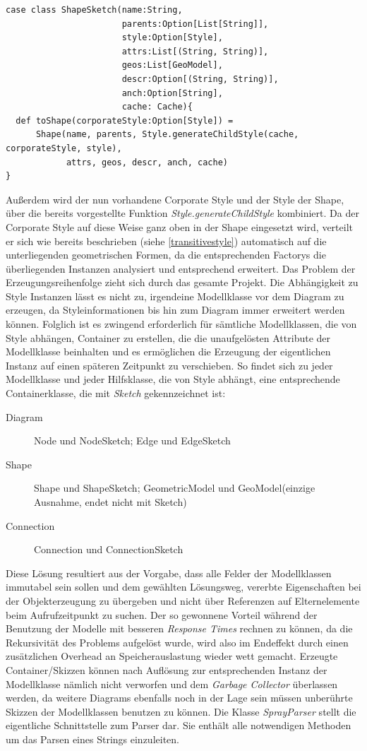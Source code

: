 \begin{lstlisting}[style=scala, caption = {Auszug aus Code Definition der ShapeSketch container Klasse}, label = {lst:shapesketch}]
case class ShapeSketch(name:String,
                       parents:Option[List[String]],
                       style:Option[Style],
                       attrs:List[(String, String)],
                       geos:List[GeoModel],
                       descr:Option[(String, String)],
                       anch:Option[String],
                       cache: Cache){
  def toShape(corporateStyle:Option[Style]) = 
      Shape(name, parents, Style.generateChildStyle(cache, corporateStyle, style),
            attrs, geos, descr, anch, cache)
}
\end{lstlisting}Außerdem wird der nun vorhandene Corporate Style und der Style der Shape, über die bereits vorgestellte Funktion \textit{Style.generateChildStyle} kombiniert. Da der Corporate Style auf diese Weise ganz oben in der Shape eingesetzt wird, verteilt er sich wie bereits beschrieben (siehe \ref{transitivestyle}) automatisch auf die unterliegenden geometrischen Formen, da die entsprechenden Factorys die überliegenden Instanzen analysiert und entsprechend erweitert. Das Problem der Erzeugungsreihenfolge zieht sich durch das gesamte Projekt. Die Abhängigkeit zu Style Instanzen lässt es nicht zu, irgendeine Modellklasse vor dem Diagram zu erzeugen, da Styleinformationen bis hin zum Diagram immer erweitert werden können.
Folglich ist es zwingend erforderlich für sämtliche Modellklassen, die von Style abhängen, Container zu erstellen, die die unaufgelösten Attribute der Modellklasse beinhalten und es ermöglichen die Erzeugung der eigentlichen Instanz auf einen späteren Zeitpunkt zu verschieben. So findet sich zu jeder Modellklasse und jeder Hilfsklasse, die von Style abhängt, eine entsprechende Containerklasse, die mit \textit{Sketch} gekennzeichnet ist:
\begin{description}
\item[Diagram] Node und NodeSketch; Edge und EdgeSketch
\item[Shape] Shape und ShapeSketch; GeometricModel und GeoModel(einzige Ausnahme, endet nicht mit Sketch)
\item[Connection] Connection und ConnectionSketch
\end{description}Diese Lösung resultiert aus der Vorgabe, dass alle Felder der Modellklassen immutabel sein sollen und dem gewählten Lösungsweg, vererbte Eigenschaften bei der Objekterzeugung zu übergeben und nicht über Referenzen auf Elternelemente beim Aufrufzeitpunkt zu suchen. Der so gewonnene Vorteil während der Benutzung der Modelle mit besseren \textit{Response Times} rechnen zu können, da die Rekursivität des Problems aufgelöst wurde, wird also im Endeffekt durch einen zusätzlichen Overhead an Speicherauslastung wieder wett gemacht. Erzeugte Container/Skizzen können nach Auflösung zur entsprechenden Instanz der Modellklasse nämlich nicht verworfen und dem \textit{Garbage Collector} überlassen werden, da weitere Diagrams ebenfalls noch in der Lage sein müssen unberührte Skizzen der Modellklassen benutzen zu können. Die Klasse \textit{SprayParser} stellt die eigentliche Schnittstelle zum Parser dar. Sie enthält alle notwendigen Methoden um das Parsen eines Strings einzuleiten. 
